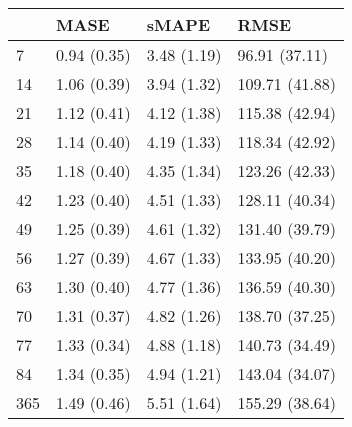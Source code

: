 \begin{tabular}{llll}
\toprule
{} &         MASE &        sMAPE &            RMSE \\
\midrule
7   &  0.94 (0.35) &  3.48 (1.19) &   96.91 (37.11) \\
14  &  1.06 (0.39) &  3.94 (1.32) &  109.71 (41.88) \\
21  &  1.12 (0.41) &  4.12 (1.38) &  115.38 (42.94) \\
28  &  1.14 (0.40) &  4.19 (1.33) &  118.34 (42.92) \\
35  &  1.18 (0.40) &  4.35 (1.34) &  123.26 (42.33) \\
42  &  1.23 (0.40) &  4.51 (1.33) &  128.11 (40.34) \\
49  &  1.25 (0.39) &  4.61 (1.32) &  131.40 (39.79) \\
56  &  1.27 (0.39) &  4.67 (1.33) &  133.95 (40.20) \\
63  &  1.30 (0.40) &  4.77 (1.36) &  136.59 (40.30) \\
70  &  1.31 (0.37) &  4.82 (1.26) &  138.70 (37.25) \\
77  &  1.33 (0.34) &  4.88 (1.18) &  140.73 (34.49) \\
84  &  1.34 (0.35) &  4.94 (1.21) &  143.04 (34.07) \\
365 &  1.49 (0.46) &  5.51 (1.64) &  155.29 (38.64) \\
\bottomrule
\end{tabular}
